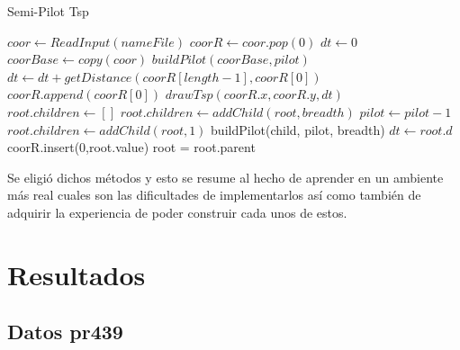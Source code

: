 \documentclass{article}
\begin{document}
\begin{algorithm}[H]
	\caption{Semi-Pilot Tsp}\label{SemiPilotTsp}
	\begin{algorithmic}[1]
		\State $coor \gets ReadInput(nameFile)$ 
		\State $coorR \gets coor.pop(0)$ 
		\State $dt \gets 0$ 
		\State $coorBase \gets copy(coor)$ 
		\State $buildPilot(coorBase, pilot)$ 
		\State $dt \gets dt + getDistance(coorR[length - 1], coorR[0])$ 
		\State $coorR.append(coorR[0])$ 
		\State $drawTsp(coorR.x, coorR.y, dt)$
		\EndProcedure
		\\
			\State $root.children \gets []$
			 
				\State $root.children \gets addChild(root, breadth)$
				\State $pilot \gets pilot - 1$
			\Else {}
				\State $root.children \gets addChild(root, 1)$
			\EndIf
					\State buildPilot(child, pilot, breadth)
				\EndFor
			\Else {}
				 
					\State $dt \gets root.d$
						\State coorR.insert(0,root.value) 
						\State root = root.parent
					\EndWhile
				\EndIf
			\EndIf
		\EndProcedure
	\end{algorithmic}
\end{algorithm}

Se eligió dichos métodos y esto se resume al hecho de aprender en un ambiente más real cuales son las dificultades de implementarlos así como también de adquirir la experiencia de poder construir cada unos de estos.

\section{Resultados}

\subsection{Datos pr439}
\end{document}
